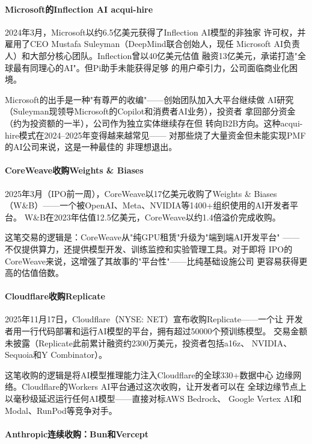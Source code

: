 \paragraph{Microsoft的Inflection AI acqui-hire}

2024年3月，Microsoft以约6.5亿美元获得了Inflection AI模型的非独家
许可权，并雇用了CEO Mustafa Suleyman（DeepMind联合创始人，现任
Microsoft AI负责人）和大部分核心团队。Inflection曾以40亿美元估值
融资13亿美元，承诺打造"全球最有同理心的AI"。但Pi助手未能获得足够
的用户牵引力，公司面临商业化困境。

Microsoft的出手是一种"有尊严的收编"——创始团队加入大平台继续做
AI研究（Suleyman现领导Microsoft的Copilot和消费者AI业务），投资者
拿回部分资金（约为投资额的一半），公司作为独立实体继续存在但
转向B2B方向。这种acqui-hire模式在2024--2025年变得越来越常见——
对那些烧了大量资金但未能实现PMF的AI公司来说，这是一种最佳的
非理想退出。

\paragraph{CoreWeave收购Weights \& Biases}

2025年3月（IPO前一周），CoreWeave以17亿美元收购了Weights \& Biases
（W\&B）——一个被OpenAI、Meta、NVIDIA等1400+组织使用的AI开发者平台。
W\&B在2023年估值12.5亿美元，CoreWeave以约1.4倍溢价完成收购。

这笔交易的逻辑是：CoreWeave从"纯GPU租赁"升级为"端到端AI开发平台"
——不仅提供算力，还提供模型开发、训练监控和实验管理工具。对于即将
IPO的CoreWeave来说，这增强了其故事的"平台性"——比纯基础设施公司
更容易获得更高的估值倍数。

\paragraph{Cloudflare收购Replicate}

2025年11月17日，Cloudflare（NYSE: NET）宣布收购Replicate——一个让
开发者用一行代码部署和运行AI模型的平台，拥有超过50000个预训练模型。
交易金额未披露（Replicate此前累计融资约2300万美元，投资者包括a16z、
NVIDIA、Sequoia和Y Combinator）。

这笔收购的逻辑是将AI模型推理能力注入Cloudflare的全球330+数据中心
边缘网络。Cloudflare的Workers AI平台通过这次收购，让开发者可以在
全球边缘节点上以毫秒级延迟运行任何AI模型——直接对标AWS Bedrock、
Google Vertex AI和Modal、RunPod等竞争对手。

\paragraph{Anthropic连续收购：Bun和Vercept}

